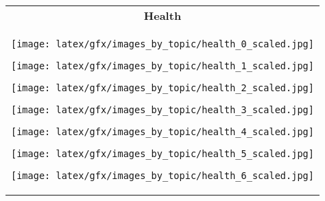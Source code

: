 \begin{table*}[ht]
\begin{tabular}{c}
            \textbf{Health}  \\ \cmidrule(lr){1-1}
                    \begin{minipage}{0.08\textwidth}
                        \centering
                        \texttt{[image: latex/gfx/images\_by\_topic/health\_0\_scaled.jpg]}
                    \end{minipage}
                    \hfill
                    \begin{minipage}{0.08\textwidth}
                        \centering
                        \texttt{[image: latex/gfx/images\_by\_topic/health\_1\_scaled.jpg]}
                    \end{minipage}
                    \hfill
                    \begin{minipage}{0.08\textwidth}
                        \centering
                        \texttt{[image: latex/gfx/images\_by\_topic/health\_2\_scaled.jpg]}
                    \end{minipage}
                    \hfill
                    \begin{minipage}{0.08\textwidth}
                        \centering
                        \texttt{[image: latex/gfx/images\_by\_topic/health\_3\_scaled.jpg]}
                    \end{minipage}
                    \hfill
                    \begin{minipage}{0.08\textwidth}
                        \centering
                        \texttt{[image: latex/gfx/images\_by\_topic/health\_4\_scaled.jpg]}
                    \end{minipage}
                    \hfill
                    \begin{minipage}{0.08\textwidth}
                        \centering
                        \texttt{[image: latex/gfx/images\_by\_topic/health\_5\_scaled.jpg]}
                    \end{minipage}
                    \hfill
                    \begin{minipage}{0.08\textwidth}
                        \centering
                        \texttt{[image: latex/gfx/images\_by\_topic/health\_6\_scaled.jpg]}
                    \end{minipage}
                    \hfill
                    \begin{minipage}{0.08\textwidth}

\end{minipage}
\end{tabular}
\end{table*}
